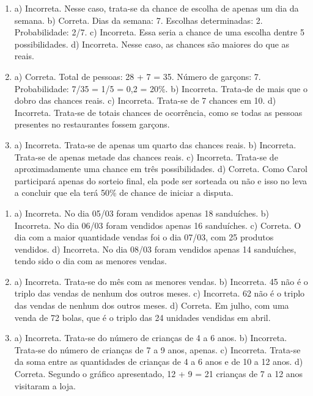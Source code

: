 
\begin{enumerate}
\item
a) Incorreta. Nesse caso, trata-se da chance de escolha de apenas um dia da semana.
b) Correta. 
Dias da semana: 7.
Escolhas determinadas: 2.
Probabilidade: 2/7.
c) Incorreta. Essa seria a chance de uma escolha dentre 5 possibilidades.
d) Incorreta. Nesse caso, as chances são maiores do que as reais.

\item
a) Correta. 
Total de pessoas: 28 + 7 = 35.
Número de garçons: 7.
Probabilidade: 7/35 = 1/5 = 0,2 = 20\%.
b) Incorreta. Trata-de de mais que o dobro das chances reais.
c) Incorreta. Trata-se de 7 chances em 10.
d) Incorreta. Trata-se de totais chances de ocorrência, como se todas as pessoas presentes no restaurantes fossem garçons.

\item
a) Incorreta. Trata-se de apenas um quarto das chances reais.
b) Incorreta. Trata-se de apenas metade das chances reais.
c) Incorreta. Trata-se de aproximadamente uma chance em três possibilidades.
d) Correta. Como Carol participará apenas do sorteio final, ela pode ser sorteada ou
não e isso no leva a concluir que ela terá 50\% de chance de iniciar a
disputa.
\end{enumerate}


\begin{enumerate}
\item
a) Incorreta. No dia 05/03 foram vendidos apenas 18 sanduíches.
b) Incorreta. No dia 06/03 foram vendidos apenas 16 sanduíches.
c) Correta. O dia com a maior quantidade vendas foi o dia 07/03, com 25 produtos
vendidos.
d) Incorreta. No dia 08/03 foram vendidos apenas 14 sanduíches, tendo sido o dia com as menores vendas.

\item
a) Incorreta. Trata-se do mês com as menores vendas.
b) Incorreta. 45 não é o triplo das vendas de nenhum dos outros meses.
c) Incorreta. 62 não é o triplo das vendas de nenhum dos outros meses.
d) Correta. Em julho, com uma venda de 72 bolas, que é o triplo das 24 unidades vendidas em abril.

\item
a) Incorreta. Trata-se do número de crianças de 4 a 6 anos.
b) Incorreta. Trata-se do número de crianças de 7 a 9 anos, apenas.
c) Incorreta. Trata-se da soma entre as quantidades de crianças de 4 a 6 anos e de 10 a 12 anos.
d) Correta. Segundo o gráfico apresentado, 12 + 9 = 21 crianças de 7 a 12 anos
visitaram a loja.
\end{enumerate}

